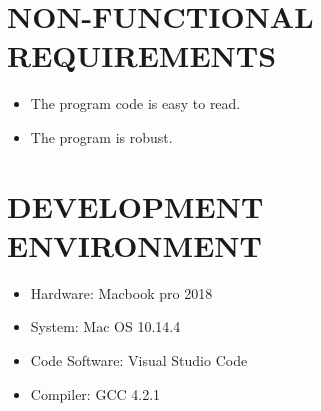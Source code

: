 \documentclass{article}
\begin{document}
\newpage
\section{NON-FUNCTIONAL REQUIREMENTS}

\begin{itemize}
\item The program code is easy to read.
\item The program is robust.
\end{itemize}

\newpage
\section{DEVELOPMENT ENVIRONMENT}

\begin{itemize}
\item Hardware: Macbook pro 2018
\item System: Mac OS 10.14.4
\item Code Software: Visual Studio Code
\item Compiler: GCC 4.2.1
\end{itemize}
\end{document}
